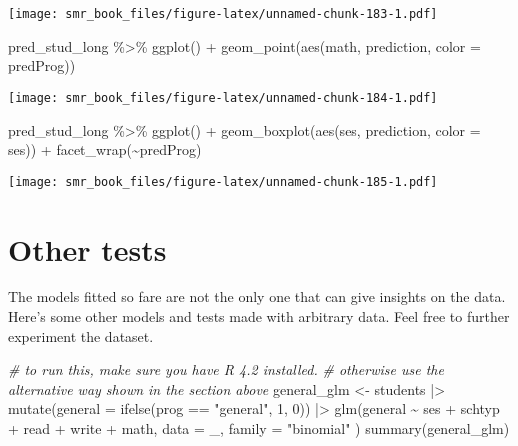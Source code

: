 \documentclass[
  oneside]{book}
\newenvironment{Shaded}{\begin{snugshade}}{\end{snugshade}}
\newcommand{\AttributeTok}[1]{\textcolor[rgb]{0.77,0.63,0.00}{#1}}
\newcommand{\CommentTok}[1]{\textcolor[rgb]{0.56,0.35,0.01}{\textit{#1}}}
\newcommand{\DecValTok}[1]{\textcolor[rgb]{0.00,0.00,0.81}{#1}}
\newcommand{\FunctionTok}[1]{\textcolor[rgb]{0.00,0.00,0.00}{#1}}
\newcommand{\NormalTok}[1]{#1}
\newcommand{\OtherTok}[1]{\textcolor[rgb]{0.56,0.35,0.01}{#1}}
\newcommand{\SpecialCharTok}[1]{\textcolor[rgb]{0.00,0.00,0.00}{#1}}
\newcommand{\StringTok}[1]{\textcolor[rgb]{0.31,0.60,0.02}{#1}}
\begin{document}
\texttt{[image: smr\_book\_files/figure-latex/unnamed-chunk-183-1.pdf]}

\begin{Shaded}
\begin{Highlighting}[]
\NormalTok{pred\_stud\_long }\SpecialCharTok{\%\textgreater{}\%}
  \FunctionTok{ggplot}\NormalTok{() }\SpecialCharTok{+}
  \FunctionTok{geom\_point}\NormalTok{(}\FunctionTok{aes}\NormalTok{(math, prediction, }\AttributeTok{color =}\NormalTok{ predProg))}
\end{Highlighting}
\end{Shaded}

\texttt{[image: smr\_book\_files/figure-latex/unnamed-chunk-184-1.pdf]}

\begin{Shaded}
\begin{Highlighting}[]
\NormalTok{pred\_stud\_long }\SpecialCharTok{\%\textgreater{}\%}
  \FunctionTok{ggplot}\NormalTok{() }\SpecialCharTok{+}
  \FunctionTok{geom\_boxplot}\NormalTok{(}\FunctionTok{aes}\NormalTok{(ses, prediction, }\AttributeTok{color =}\NormalTok{ ses)) }\SpecialCharTok{+}
  \FunctionTok{facet\_wrap}\NormalTok{(}\SpecialCharTok{\textasciitilde{}}\NormalTok{predProg)}
\end{Highlighting}
\end{Shaded}

\texttt{[image: smr\_book\_files/figure-latex/unnamed-chunk-185-1.pdf]}

\hypertarget{other-tests}{%
\section{Other tests}\label{other-tests}}

The models fitted so fare are not the only one that can give
insights on the data. Here's some other models and tests made with
arbitrary data.
Feel free to further experiment the dataset.

\begin{Shaded}
\begin{Highlighting}[]
\CommentTok{\# to run this, make sure you have R 4.2 installed.}
\CommentTok{\# otherwise use the alternative way shown in the section above}
\NormalTok{general\_glm }\OtherTok{\textless{}{-}}\NormalTok{ students }\SpecialCharTok{|\textgreater{}}
  \FunctionTok{mutate}\NormalTok{(}\AttributeTok{general =} \FunctionTok{ifelse}\NormalTok{(prog }\SpecialCharTok{==} \StringTok{"general"}\NormalTok{, }\DecValTok{1}\NormalTok{, }\DecValTok{0}\NormalTok{)) }\SpecialCharTok{|\textgreater{}}
  \FunctionTok{glm}\NormalTok{(general }\SpecialCharTok{\textasciitilde{}}\NormalTok{ ses }\SpecialCharTok{+}\NormalTok{ schtyp }\SpecialCharTok{+}\NormalTok{ read }\SpecialCharTok{+}\NormalTok{ write }\SpecialCharTok{+}\NormalTok{ math,}
    \AttributeTok{data =}\NormalTok{ \_, }\AttributeTok{family =} \StringTok{"binomial"}
\NormalTok{  )}
\FunctionTok{summary}\NormalTok{(general\_glm)}
\end{Highlighting}
\end{Shaded}
\end{document}
